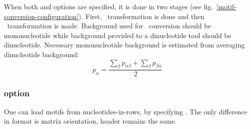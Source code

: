 


When both  and  options are specified, it is done in two stages (see fig.~\ref{motif-conversion-configuration}). First, \PcmToPwm\ transformation is done and then \PwmToDiPwm\ transformation is made. Background used for \PcmToPwm\ conversion should be mononucleotide while background provided to a dinucleotide tool should be dinucleotide. Necessary mononucleotide background is estimated from averaging dinucleotide background:
$$p_{\alpha} = \frac{\sum_{\beta}p_{\alpha\beta} + \sum_{\beta}p_{\beta\alpha}}{2}$$


\subsubsection{ option}\label{TransposeOption}
One can load motifs from nucleotides-in-rows, by specifying . The only difference in format is matrix orientation, header remains the same.
